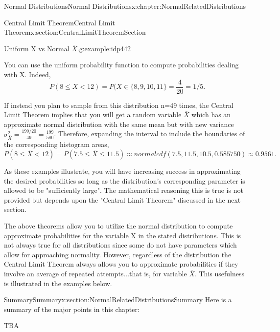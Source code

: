 \documentclass[oneside,10pt,]{book}
\numberwithin{equation}{section}
\newcommand{\lt}{<}
\begin{document}
\begin{chapterptx}{Normal Distributions}{}{Normal Distributions}{}{}{x:chapter:NormalRelatedDistributions}
\begin{sectionptx}{Central Limit Theorem}{}{Central Limit Theorem}{}{}{x:section:CentralLimitTheoremSection}
\begin{example}{Uniform X vs Normal \(\overline{X}\).}{g:example:idp442}
\par
You can use the uniform probability function to compute probabilities dealing with X. Indeed,%
\begin{equation*}
P(8 \le X \lt 12) = P(X \in \{8,9,10,11 \} = \frac{4}{20} = 1/5.
\end{equation*}
%
\par
If instead you plan to sample from this distribution n=49 times, the Central Limit Theorem implies that you will get a random variable \(\overline{X}\) which has an approximate normal distribution with the same mean but with new variance \(\sigma_{\overline{X}}^2 = \frac{199/20}{49} = \frac{199}{580}\).  Therefore, expanding the interval to include the boundaries of the corresponding histogram areas,%
\begin{equation*}
P( 8 \le \overline{X} \lt 12 ) = P(7.5 \le \overline{X} \le 11.5) \approx normalcdf(7.5,11.5,10.5,0.585750) \approx 0.9561 .
\end{equation*}
%
\end{example}
As these examples illustrate, you will have increasing success in approximating the desired probabilities so long as the distribution's corresponding parameter is allowed to be "sufficiently large". The mathematical reasoning this is true is not provided but depends upon the "Central Limit Theorem" discussed in the next section.%
\par
The above theorems allow you to utilize the normal distribution to compute approximate probabilities for the variable X in the stated distributions. This is not always true for all distributions since some do not have parameters which allow for approaching normality. However, regardless of the distribution the Central Limit Theorem always allows you to approximate probabilities if they involve an average of repeated attempts...that is, for variable \(\overline{X}\). This usefulness is illustrated in the examples below.%
\end{sectionptx}
%
%
\typeout{************************************************}
\typeout{************************************************}
%
\begin{sectionptx}{Summary}{}{Summary}{}{}{x:section:NormalRelatedDistributionsSummary}
Here is a summary of the major points in this chapter:%
\par
TBA%
\end{sectionptx}
%
%
\typeout{************************************************}
\typeout{************************************************}

\end{chapterptx}
\end{document}
